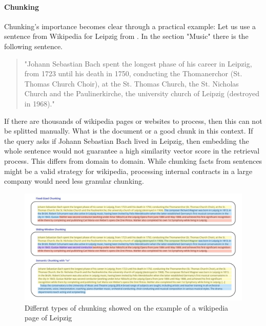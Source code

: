 \paragraph{Chunking}
\label{sec:chunk}
Chunking's importance becomes clear through a practical example: Let us use a sentence from Wikipedia \cite{LeipzigWikipedia.2025} for Leipzig from \citeyear{LeipzigWikipedia.2025}. In the section "Music" there is the following sentence. 

\begin{quote}
    "Johann Sebastian Bach spent the longest phase of his career in Leipzig, from 1723 until his death in 1750, conducting the Thomanerchor (St. Thomas Church Choir), at the St. Thomas Church, the St. Nicholas Church and the Paulinerkirche, the university church of Leipzig (destroyed in 1968)."
\end{quote}

If there are thousands of wikipedia pages or websites to process, then this can not be splitted manually. What is the document or a good chunk in this context. If the query asks if Johann Sebastian Bach lived in Leipzig, then embedding the whole sentence would not guarantee a high similarity vector score in the retrieval process. This differs from domain to domain. While chunking facts from sentences might be a valid strategy for wikipedia, processing internal contracts in a large company would need less granular chunking. 

\begin{figure}
    \centering
    \includegraphics[width=\textwidth]{images/Chunking.pdf}
    \caption{Differnt types of chunking showed on the example of a wikipedia page of Leipzig\cite{LeipzigWikipedia.2025}}
    \label{fig:chunking}
\end{figure}


